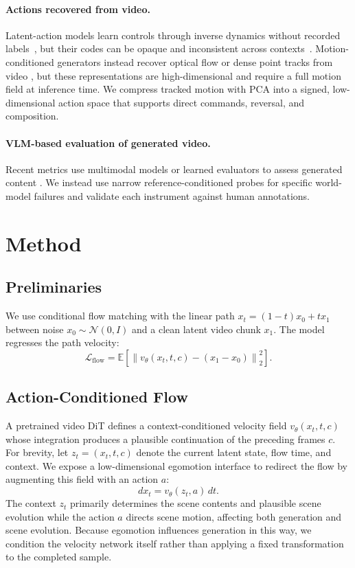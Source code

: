 \documentclass[letterpaper]{article} %
\begin{document}
\paragraph{Actions recovered from video.}
Latent-action models learn controls through inverse dynamics without recorded
labels~\cite{genie,lapo,lapa,adaworld}, but their codes can be opaque and
inconsistent across contexts~\cite{olafworld}. Motion-conditioned generators
instead recover optical flow or dense point tracks from video
\cite{motionprompting,flovd,onlyflow}, but these representations are
high-dimensional and require a full motion field at inference time. We
compress tracked motion with PCA into a signed, low-dimensional action space
that supports direct commands, reversal, and composition.

\paragraph{VLM-based evaluation of generated video.}
Recent metrics use multimodal models or learned evaluators to assess generated
content \cite{viescore,vqascore,videophy,videoscore,videobench}. We instead use
narrow reference-conditioned probes for specific world-model failures and
validate each instrument against human annotations.

\section{Method}
\subsection{Preliminaries}
We use conditional flow matching with the linear path
$x_t=(1-t)x_0+t x_1$ between noise $x_0\sim\mathcal{N}(0,I)$ and a clean latent
video chunk $x_1$. The model regresses the path velocity:
\begin{equation}
\mathcal{L}_{\mathrm{flow}}
=
\mathbb{E}\!\left[
\left\|v_\theta(x_t,t,c)-(x_1-x_0)\right\|_2^2
\right].
\end{equation}

\subsection{Action-Conditioned Flow}
\label{sec:planar}

A pretrained video DiT defines a context-conditioned velocity field
$v_\theta(x_t,t,c)$ whose integration produces a plausible continuation of
the preceding frames $c$. For brevity, let $z_t=(x_t,t,c)$ denote the current
latent state, flow time, and context. We expose a low-dimensional egomotion
interface to redirect the flow by augmenting this field with an action $a$:
\begin{equation}
    d x_t = v_\theta(z_t,a)\,dt.
    \label{eq:action_conditioned_ode}
\end{equation}
The context $z_t$ primarily determines the scene contents and plausible scene evolution while the action $a$ directs scene motion, affecting both generation and scene evolution. Because egomotion influences generation in this way, we condition the velocity network itself rather than applying a
fixed transformation to the completed sample.
\end{document}
